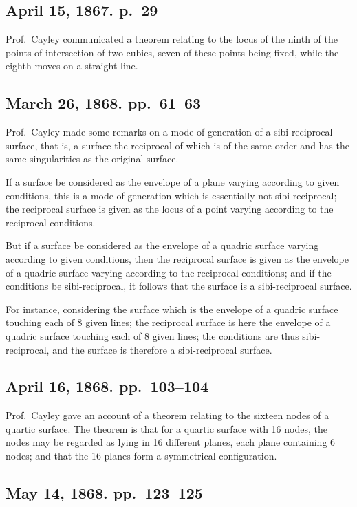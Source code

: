 \documentclass[12pt,a4paper]{article}
\theoremstyle{plain}
\theoremstyle{definition}
\theoremstyle{remark}
\begin{document}
\subsection*{April 15, 1867. p.~29}

Prof.~Cayley communicated a theorem relating to the locus of the ninth of the points of intersection of two cubics, seven of these points being fixed, while the eighth moves on a straight line.

\subsection*{March 26, 1868. pp.~61--63}

Prof.~Cayley made some remarks on a mode of generation of a sibi-reciprocal surface, that is, a surface the reciprocal of which is of the same order and has the same singularities as the original surface.

If a surface be considered as the envelope of a plane varying according to given conditions, this is a mode of generation which is essentially not sibi-reciprocal; the reciprocal surface is given as the locus of a point varying according to the reciprocal conditions.

But if a surface be considered as the envelope of a quadric surface varying according to given conditions, then the reciprocal surface is given as the envelope of a quadric surface varying according to the reciprocal conditions; and if the conditions be sibi-reciprocal, it follows that the surface is a sibi-reciprocal surface.

For instance, considering the surface which is the envelope of a quadric surface touching each of 8 given lines; the reciprocal surface is here the envelope of a quadric surface touching each of 8 given lines; the conditions are thus sibi-reciprocal, and the surface is therefore a sibi-reciprocal surface.

\subsection*{April 16, 1868. pp.~103--104}

Prof.~Cayley gave an account of a theorem relating to the sixteen nodes of a quartic surface. The theorem is that for a quartic surface with 16 nodes, the nodes may be regarded as lying in 16 different planes, each plane containing 6 nodes; and that the 16 planes form a symmetrical configuration.

\subsection*{May 14, 1868. pp.~123--125}
\end{document}
